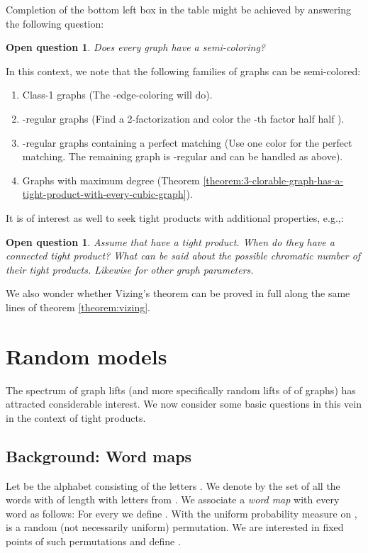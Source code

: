 \documentclass[12pt]{article}
\newtheorem{open question}[theorem]{Open question}
\begin{document}
Completion of the bottom left box in the table might be achieved by answering the following question: 
\begin{open question}
Does every graph have a semi-coloring?
\end{open question}
In this context, we note that the following families of graphs can be semi-colored:
\begin{enumerate}
\item Class-1 graphs (The -edge-coloring will do).
\item -regular graphs (Find a 2-factorization and color the -th factor half  half ).
\item -regular graphs containing a perfect matching (Use one color for the perfect matching. The remaining graph is -regular and can be handled as above).
\item Graphs with maximum degree  (Theorem \ref{theorem:3-clorable-graph-has-a-tight-product-with-every-cubic-graph}).
\end{enumerate}
It is of interest as well to seek tight products with additional properties, e.g.,:
\begin{open question}
Assume that  have a tight product. When do they have a connected tight product?
What can be said about the possible chromatic number of their tight products. Likewise for
other graph parameters.
\end{open question}
We also wonder whether Vizing's theorem can be proved in full along the same lines of theorem \ref{theorem:vizing}.

\section{Random models}\label{se:random models}

The spectrum of graph lifts (and more specifically random lifts of
of graphs) has attracted considerable interest. We now consider some basic questions in this vein
in the context of tight products.

\subsection{Background: Word maps}\label{Background:-Word-maps}
Let  be the alphabet consisting of the letters . We denote by  the set of all the words  with 
of length  with letters from . We associate a {\em word map} 
with every word  as follows:
For every  we define . With the uniform probability measure on ,  is a random (not necessarily uniform) permutation. We are interested in fixed points of such permutations and define .
\end{document}
